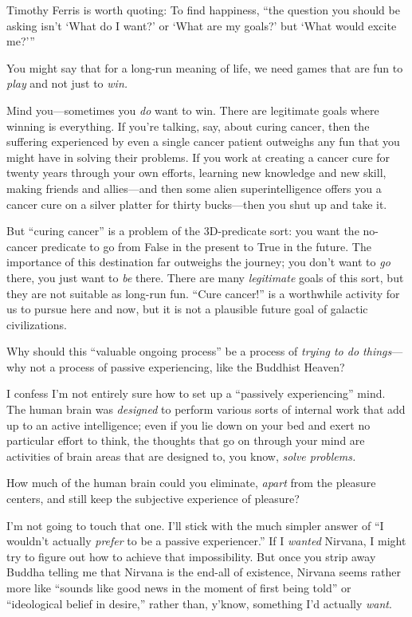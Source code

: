 {
 Timothy Ferris is worth quoting: To find happiness,
``the question you should be asking
isn't `What do I want?'
or `What are my goals?' but
`What would excite
me?'''}

{
 You might say that for a long-run meaning of life, we need games
that are fun to \textit{play} and not just to \textit{win.}}

{
 Mind you---sometimes you \textit{do} want to win. There are
legitimate goals where winning is everything. If you're
talking, say, about curing cancer, then the suffering experienced by
even a single cancer patient outweighs any fun that you might have in
solving their problems. If you work at creating a cancer cure for
twenty years through your own efforts, learning new knowledge and new
skill, making friends and allies---and then some alien
superintelligence offers you a cancer cure on a silver platter for
thirty bucks---then you shut up and take it.}

{
 But ``curing cancer'' is a
problem of the 3D-predicate sort: you want the no-cancer predicate to
go from False in the present to True in the future. The importance of
this destination far outweighs the journey; you don't
want to \textit{go} there, you just want to \textit{be} there. There
are many \textit{legitimate} goals of this sort, but they are not
suitable as long-run fun. ``Cure
cancer!'' is a worthwhile activity for us to pursue
here and now, but it is not a plausible future goal of galactic
civilizations.}

{
 Why should this ``valuable ongoing
process'' be a process of \textit{trying to do
things}{}---why not a process of passive experiencing, like the
Buddhist Heaven?}

{
 I confess I'm not entirely sure how to set up a
``passively experiencing'' mind. The
human brain was \textit{designed} to perform various sorts of internal
work that add up to an active intelligence; even if you lie down on
your bed and exert no particular effort to think, the thoughts that go
on through your mind are activities of brain areas that are designed
to, you know, \textit{solve problems.}}

{
 How much of the human brain could you eliminate, \textit{apart}
from the pleasure centers, and still keep the subjective experience of
pleasure?}

{
 I'm not going to touch that one.
I'll stick with the much simpler answer of
``I wouldn't actually \textit{prefer}
to be a passive experiencer.'' If I \textit{wanted}
Nirvana, I might try to figure out how to achieve that impossibility.
But once you strip away Buddha telling me that Nirvana is the end-all
of existence, Nirvana seems rather more like ``sounds
like good news in the moment of first being told'' or
``ideological belief in desire,''
rather than, y'know, something I'd
actually \textit{want}.}

